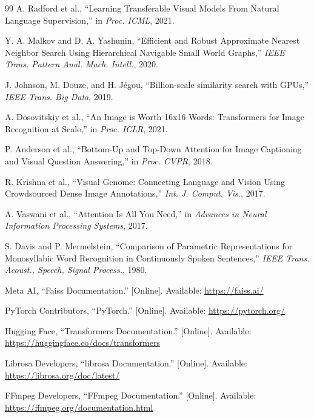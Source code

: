 \documentclass[10pt,conference]{IEEEtran}
\begin{document}
\begin{thebibliography}{99}
A. Radford et al.,
``Learning Transferable Visual Models From Natural Language Supervision,''
in \emph{Proc. ICML}, 2021.

Y. A. Malkov and D. A. Yashunin,
``Efficient and Robust Approximate Nearest Neighbor Search Using Hierarchical Navigable Small World Graphs,''
\emph{IEEE Trans. Pattern Anal. Mach. Intell.}, 2020.

J. Johnson, M. Douze, and H. Jégou,
``Billion-scale similarity search with GPUs,''
\emph{IEEE Trans. Big Data}, 2019.

A. Dosovitskiy et al.,
``An Image is Worth 16x16 Words: Transformers for Image Recognition at Scale,''
in \emph{Proc. ICLR}, 2021.

P. Anderson et al.,
``Bottom-Up and Top-Down Attention for Image Captioning and Visual Question Answering,''
in \emph{Proc. CVPR}, 2018.

R. Krishna et al.,
``Visual Genome: Connecting Language and Vision Using Crowdsourced Dense Image Annotations,''
\emph{Int. J. Comput. Vis.}, 2017.

A. Vaswani et al.,
``Attention Is All You Need,''
in \emph{Advances in Neural Information Processing Systems}, 2017.

S. Davis and P. Mermelstein,
``Comparison of Parametric Representations for Monosyllabic Word Recognition in Continuously Spoken Sentences,''
\emph{IEEE Trans. Acoust., Speech, Signal Process.}, 1980.

Meta AI,
``Faiss Documentation.''
[Online]. Available: \url{https://faiss.ai/}

PyTorch Contributors,
``PyTorch.''
[Online]. Available: \url{https://pytorch.org/}

Hugging Face,
``Transformers Documentation.''
[Online]. Available: \url{https://huggingface.co/docs/transformers}

Librosa Developers,
``librosa Documentation.''
[Online]. Available: \url{https://librosa.org/doc/latest/}

FFmpeg Developers,
``FFmpeg Documentation.''
[Online]. Available: \url{https://ffmpeg.org/documentation.html}

\end{thebibliography}
\end{document}
